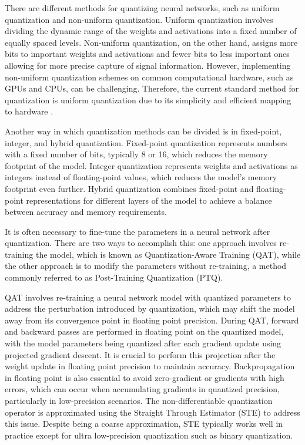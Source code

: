 There are different methods for quantizing neural networks, such as uniform quantization and non-uniform quantization. Uniform quantization involves dividing the dynamic range of the weights and activations into a fixed number of equally spaced levels. Non-uniform quantization, on the other hand, assigns more bits to important weights and activations and fewer bits to less important ones allowing for more precise capture of signal information. However, implementing non-uniform quantization schemes on common computational hardware, such as GPUs and CPUs, can be challenging. Therefore, the current standard method for quantization is uniform quantization due to its simplicity and efficient mapping to hardware \cite{gholami2021survey}.

Another way in which quantization methods can be divided is in fixed-point, integer, and hybrid quantization. Fixed-point quantization represents numbers with a fixed number of bits, typically 8 or 16, which reduces the memory footprint of the model. Integer quantization represents weights and activations as integers instead of floating-point values, which reduces the model's memory footprint even further. Hybrid quantization combines fixed-point and floating-point representations for different layers of the model to achieve a balance between accuracy and memory requirements.

It is often necessary to fine-tune the parameters in a neural network after quantization. There are two ways to accomplish this: one approach involves re-training the model, which is known as Quantization-Aware Training (QAT), while the other approach is to modify the parameters without re-training, a method commonly referred to as Post-Training Quantization (PTQ).

QAT involves re-training a neural network model with quantized parameters to address the perturbation introduced by quantization, which may shift the model away from its convergence point in floating point precision. During QAT, forward and backward passes are performed in floating point on the quantized model, with the model parameters being quantized after each gradient update using projected gradient descent. It is crucial to perform this projection after the weight update in floating point precision to maintain accuracy. Backpropagation in floating point is also essential to avoid zero-gradient or gradients with high errors, which can occur when accumulating gradients in quantized precision, particularly in low-precision scenarios. The non-differentiable quantization operator is approximated using the Straight Through Estimator (STE) to address this issue. Despite being a coarse approximation, STE typically works well in practice except for ultra low-precision quantization such as binary quantization.

